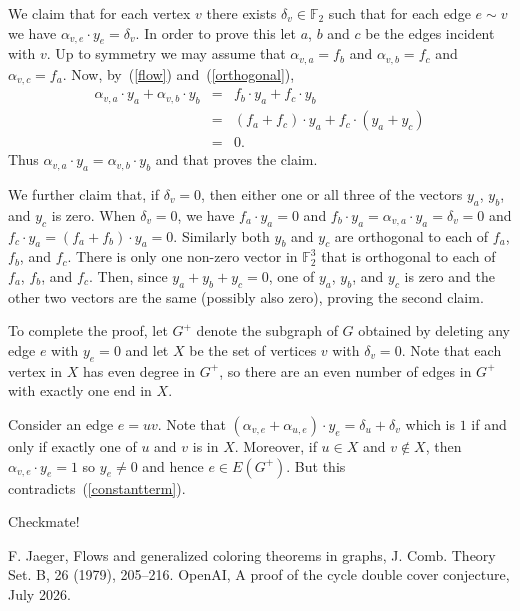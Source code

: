 \documentclass[12pt,reqno]{amsart}
\newcommand{\bF}{\mathbb F}
\begin{document}
We claim that for each vertex $v$ there exists $\delta_v\in\bF_2$ such that for each edge $e\sim v$ we have
$\alpha_{v,e}\cdot y_e = \delta_v$. In order to prove this let $a$, $b$ and $c$ be the edges incident with $v$.
Up to symmetry we may assume that $\alpha_{v,a}=f_b$ and $\alpha_{v,b}=f_c$ and $\alpha_{v,c}=f_a$. Now, by~(\ref{flow})
and~(\ref{orthogonal}),
\begin{eqnarray*}
\alpha_{v,a}\cdot y_a + \alpha_{v,b} \cdot y_b &=&  f_b\cdot y_a + f_c \cdot y_b\\
&=& (f_a+f_c)\cdot y_a + f_c \cdot (y_a+y_c)\\
&=& 0.
\end{eqnarray*}
Thus $\alpha_{v,a}\cdot y_a = \alpha_{v,b} \cdot y_b$ and that proves the claim. 

We further claim that, if $\delta_v=0$,
then either one or all three of the vectors $y_a$, $y_b$, and $y_c$ is zero. When $\delta_v=0$, we have 
$f_a\cdot y_a =0$ and $f_b \cdot y_a = \alpha_{v,a}\cdot y_a = \delta_v=0$ and
$f_c \cdot y_a = (f_a+f_b)\cdot y_a =0$. Similarly both $y_b$ and $y_c$ are orthogonal to each of
$f_a$, $f_b$, and $f_c$. There is only one non-zero vector in $\bF^3_2$ that is orthogonal to each of 
$f_a$, $f_b$, and $f_c$. Then, since $y_a+y_b+y_c=0$, one of $y_a$, $y_b$, and $y_c$ is zero and the other
two vectors are the same (possibly also zero), proving the second claim.

To complete the proof, let $G^+$ denote the subgraph of $G$ obtained by deleting any edge $e$ with $y_e=0$ and let 
$X$ be the set of vertices $v$ with $\delta_v=0$. Note that each vertex in $X$ has even degree in $G^+$,
so there are an even number of edges in $G^+$ with exactly one end in $X$.

Consider an edge $e=uv$. Note that $(\alpha_{v,e}+\alpha_{u,e})\cdot y_e = \delta_u +\delta_v$ which is $1$
if and only if exactly one of $u$ and $v$ is in $X$. Moreover, if $u\in X$ and $v\not\in X$, then
$\alpha_{v,e}\cdot y_e=1$ so $y_e\neq 0$ and hence $e\in E(G^+)$.
But this contradicts~(\ref{constantterm}).

Checkmate!

\begin{thebibliography}{}
F. Jaeger, Flows and generalized coloring theorems in graphs, 
J. Comb. Theory Set. B, 26 (1979), 205–216.
OpenAI, A proof of the cycle double cover conjecture, July 2026.
\end{thebibliography}
\end{document}
